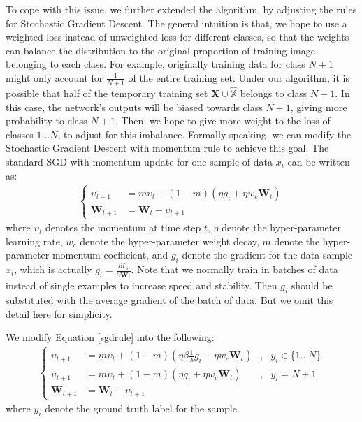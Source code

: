 To cope with this issue, we further extended the algorithm, by adjusting the rules for Stochastic Gradient Descent. The general intuition is that, we hope to use a weighted loss instead of unweighted loss for different classes, so that the weights can balance the distribution to the original proportion of training image belonging to each class. For example, originally training data for class $N+1$ might only account for $\frac{1}{N+1}$ of the entire training set. Under our algorithm, it is possible that half of the temporary training set $\mathbf{X} \cup \hat{\mathbb{X}}$ belongs to class $N+1$. In this case, the network's outputs will be biased towards class $N+1$, giving more probability to class $N+1$. Then, we hope to give more weight to the loss of classes $1...N$, to adjust for this imbalance. Formally speaking, we can modify the Stochastic Gradient Descent with momentum rule to achieve this goal. The standard SGD with momentum update for one sample of data $x_i$ can be written as:
\begin{align}
\left\{
\begin{aligned}
	\upsilon_{t+1} &= m\upsilon_t + (1-m)\left( \eta g_i + \eta w_c \mathbf{W}_t \right)\\
	\mathbf{W}_{t+1} &= \mathbf{W}_{t} - \upsilon_{t+1}
\end{aligned}
\right.
\label{sgdrule}
\end{align}
where $\upsilon_t$ denotes the momentum at time step $t$, $\eta$ denote the hyper-parameter learning rate, $w_c$ denote the hyper-parameter weight decay, $m$ denote the hyper-parameter momentum coefficient, and $g_i$ denote the gradient for the data sample $x_i$, which is actually $g_i = \frac{\partial L_i}{\partial \mathbf{W}_t}$. Note that we normally train in batches of data instead of single examples to increase speed and stability. Then $g_i$ should be substituted with the average gradient of the batch of data. But we omit this detail here for simplicity.

We modify Equation \ref{sgdrule} into the following:
\begin{align}
\left\{
\begin{aligned}
\upsilon_{t+1} &= m\upsilon_t + (1-m)\left( \eta\beta\frac{1}{\lambda} g_i + \eta w_c \mathbf{W}_t \right)&, &   y_i \in \{1...N\}\\
\upsilon_{t+1} &= m\upsilon_t + (1-m)\left( \eta g_i + \eta w_c \mathbf{W}_t \right)&, &   y_i = N+1\\
\mathbf{W}_{t+1} &= \mathbf{W}_{t} - \upsilon_{t+1}
\end{aligned}
\right.
\label{sgdrule2}
\end{align}
where $y_i$ denote the ground truth label for the sample.

